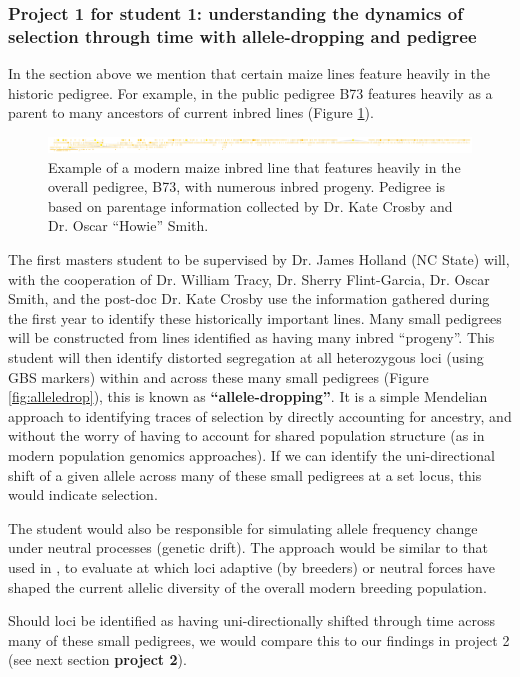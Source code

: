 \documentclass[12pt]{article}
\begin{document}
\subsubsection*{Project 1 for student 1: understanding the dynamics of selection through time with allele-dropping and pedigree}
In the section above we mention that certain maize lines feature heavily in the historic pedigree. For example, in the public pedigree B73 features heavily as a parent to many ancestors of current inbred lines (Figure \ref{fig:b73isbig}). 


\begin{figure}[ht]
\includegraphics[width=1.0\linewidth]{pedigree_poster.pdf}
\caption{Example of a modern maize inbred line that features heavily in the overall pedigree, B73, with numerous inbred progeny. Pedigree is based on parentage information collected by Dr. Kate Crosby and Dr. Oscar ``Howie'' Smith.}
\label{fig:b73isbig}
\end{figure}

\par The first masters student to be supervised by Dr. James Holland (NC State) will, with the cooperation of Dr. William Tracy, Dr. Sherry Flint-Garcia, Dr. Oscar Smith, and the post-doc Dr. Kate Crosby use the information gathered during the first year to identify these historically important lines. 
Many small pedigrees will be constructed from lines identified as having many inbred ``progeny''. 
This student will then identify distorted segregation at all heterozygous loci (using GBS markers) within and across these many small pedigrees (Figure \ref{fig:alleledrop}), this is known as \textbf{``allele-dropping''}. 
It is a simple Mendelian approach to identifying traces of selection by directly accounting for ancestry, and without the worry of having to account for shared population structure (as in modern population genomics approaches). 
If we can identify the uni-directional shift of a given allele across many of these small pedigrees at a set locus, this would indicate selection. 
\par The student would also be responsible for simulating allele frequency change under neutral processes (genetic drift). The approach would be similar to that used in \citep{Gerke:2013tw}, to evaluate at which loci adaptive (by breeders) or neutral forces have shaped the current allelic diversity of the overall modern breeding population. 
\par Should loci be identified as having uni-directionally shifted through time across many of these small pedigrees, we would compare this to our findings in project 2 (see next section \textbf{project 2}).
\end{document}

